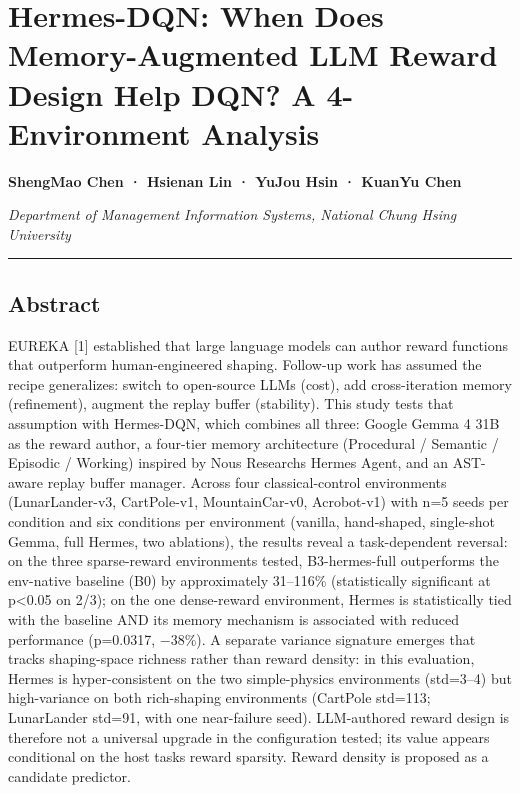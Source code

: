 \section{Hermes-DQN: When Does Memory-Augmented LLM Reward Design Help DQN? A 4-Environment Analysis}\label{hermes-dqn-when-does-memory-augmented-llm-reward-design-help-dqn-a-4-environment-analysis}

\textbf{ShengMao Chen · Hsienan Lin · YuJou Hsin · KuanYu Chen}

\emph{Department of Management Information Systems, National Chung Hsing University}

\begin{center}\rule{0.5\linewidth}{0.5pt}\end{center}

\subsection{Abstract}\label{abstract}

EUREKA {[}1{]} established that large language models can author reward functions that outperform human-engineered shaping. Follow-up work has assumed the recipe generalizes: switch to open-source LLMs (cost), add cross-iteration memory (refinement), augment the replay buffer (stability). This study tests that assumption with Hermes-DQN, which combines all three: Google Gemma 4 31B as the reward author, a four-tier memory architecture (Procedural / Semantic / Episodic / Working) inspired by Nous Research\textquotesingle s Hermes Agent, and an AST-aware replay buffer manager. Across four classical-control environments (LunarLander-v3, CartPole-v1, MountainCar-v0, Acrobot-v1) with n=5 seeds per condition and six conditions per environment (vanilla, hand-shaped, single-shot Gemma, full Hermes, two ablations), the results reveal a task-dependent reversal: on the three sparse-reward environments tested, B3-hermes-full outperforms the env-native baseline (B0) by approximately 31--116\% (statistically significant at p\textless0.05 on 2/3); on the one dense-reward environment, Hermes is statistically tied with the baseline AND its memory mechanism is associated with reduced performance (p=0.0317, −38\%). A separate variance signature emerges that tracks shaping-space richness rather than reward density: in this evaluation, Hermes is hyper-consistent on the two simple-physics environments (std=3--4) but high-variance on both rich-shaping environments (CartPole std=113; LunarLander std=91, with one near-failure seed). LLM-authored reward design is therefore not a universal upgrade in the configuration tested; its value appears conditional on the host task\textquotesingle s reward sparsity. Reward density is proposed as a candidate predictor.

